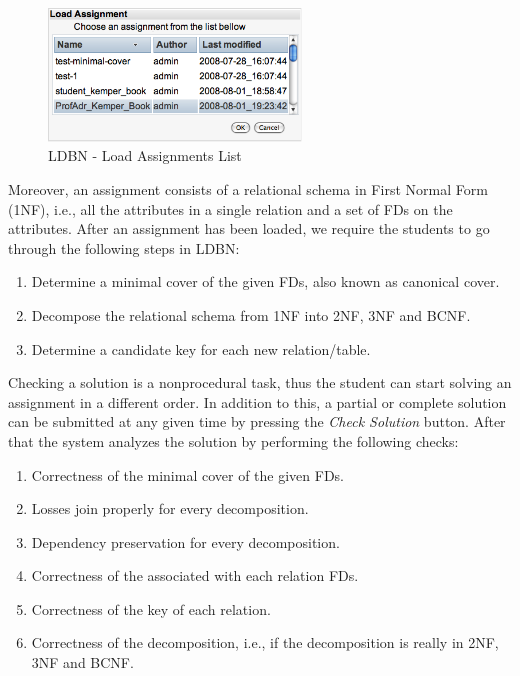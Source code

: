 \begin{figure}[h]
	\begin{center}
		\includegraphics[width=0.6\textwidth]{./img/screen02.png}
		\caption{LDBN - Load Assignments List}
		\label{fig:screen02}
	\end{center}
\end{figure}

Moreover, an assignment consists of a relational schema in First Normal Form (1NF), 
i.e., all the attributes in a single relation and a set of FDs on the attributes. 
After an assignment has been loaded, we require the students to go through the 
following steps in LDBN:
\begin{enumerate}
	\item Determine a minimal cover of the given FDs, also known as canonical cover.
	\item Decompose the relational schema from 1NF into 2NF, 3NF and BCNF. 
	\item Determine a candidate key for each new relation/table. 
\end{enumerate}

Checking a solution is a nonprocedural task, thus the student can start solving
an assignment in a different order. In addition to this,  a partial or complete 
solution can be submitted at any given time by pressing the \textit{Check Solution} button. 
After that the system analyzes the solution by performing the following checks:
\begin{enumerate}
	\item Correctness of the minimal cover of the given FDs. 
	\item Losses join properly for every decomposition.
	\item Dependency preservation for every decomposition.
	\item Correctness of the associated with each relation FDs.
	\item Correctness of the key of each relation.
	\item Correctness of the decomposition, i.e., if the decomposition is really in 2NF, 3NF and BCNF.
\end{enumerate}

